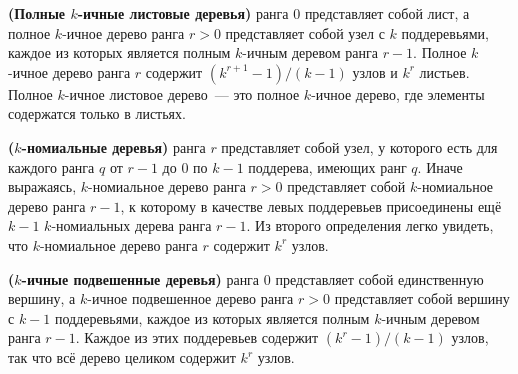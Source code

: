 \begin{definition}\label{def:9.4}
  \textbf{(Полные $k$-ичные листовые деревья)}  ранга 0 представляет собой лист, а полное $k$-ичное
  дерево ранга $r > 0$ представляет собой узел с $k$ поддеревьями,
  каждое из которых является полным $k$-ичным деревом ранга
  $r-1$. Полное $k$-ичное дерево ранга $r$ содержит $(k^{r+1} - 1) /
  (k - 1)$ узлов и $k^r$ листьев. Полное $k$-ичное листовое дерево~---
  это полное $k$-ичное дерево, где элементы содержатся только в листьях.
\end{definition}
\begin{definition}\label{def:9.5}
  \textbf{($k$-номиальные деревья)}  ранга $r$ представляет собой узел, у
  которого есть для каждого ранга $q$ от $r-1$ до 0 по $k-1$
  поддерева, имеющих ранг $q$. Иначе выражаясь,
  $k$-номиальное дерево ранга $r > 0$ представляет собой
  $k$-номиальное дерево ранга $r-1$, к которому в качестве левых
  поддеревьев присоединены ещё $k-1$ $k$-номиальных дерева ранга
  $r-1$. Из второго определения легко увидеть, что $k$-номиальное
  дерево ранга $r$ содержит $k^r$ узлов.
\end{definition}

\begin{definition}\label{def:9.6}
  \textbf{($k$-ичные подвешенные деревья)}  ранга 0 представляет собой единственную
вершину, а $k$-ичное подвешенное дерево ранга $r > 0$ представляет
собой вершину с $k-1$ поддеревьями, каждое из которых является полным
$k$-ичным деревом ранга $r-1$. Каждое из этих поддеревьев содержит
$(k^r - 1) / (k - 1)$ узлов, так что всё дерево целиком содержит $k^r$ узлов.
\end{definition}

